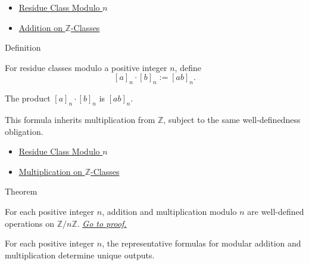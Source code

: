 \begin{dependencies}
\begin{itemize}
  \item \hyperref[def:residue-class-modulo-n]{Residue Class Modulo \(n\)}
  \item \hyperref[def:addition-on-z-classes]{Addition on \(\mathbb{Z}\)-Classes}
\end{itemize}
\end{dependencies}

\begin{definitionbox}{Definition}
\begin{definition}
\label{def:multiplication-modulo-n}
For residue classes modulo a positive integer \(n\), define
\[
[a]_n\cdot[b]_n:=[ab]_n.
\]
\end{definition}
\end{definitionbox}

\begin{remark*}
The product \([a]_n\cdot[b]_n\) is \([ab]_n\).
\end{remark*}

\begin{remark*}[Interpretation]
This formula inherits multiplication from \(\mathbb{Z}\), subject to the same
well-definedness obligation.
\end{remark*}

\begin{dependencies}
\begin{itemize}
  \item \hyperref[def:residue-class-modulo-n]{Residue Class Modulo \(n\)}
  \item \hyperref[def:multiplication-on-z-classes]{Multiplication on \(\mathbb{Z}\)-Classes}
\end{itemize}
\end{dependencies}

\begin{theorembox}{Theorem}
\begin{theorem}
\label{thm:modular-operations-well-defined}
For each positive integer \(n\), addition and multiplication modulo \(n\) are
well-defined operations on \(\mathbb{Z}/n\mathbb{Z}\).
\hyperref[prf:modular-operations-well-defined]{\textit{Go to proof.}}
\end{theorem}
\end{theorembox}

\begin{remark*}
For each positive integer \(n\), the representative formulas for modular
addition and multiplication determine unique outputs.
\end{remark*}

